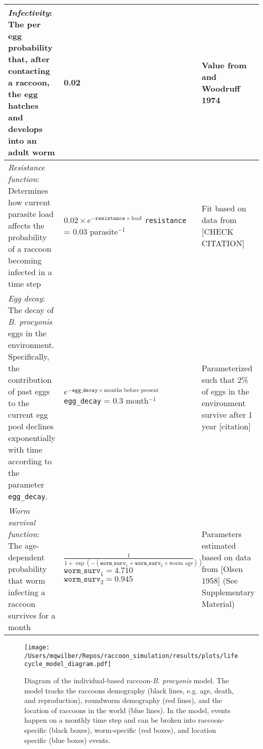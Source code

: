 \documentclass[11pt]{article}
\begin{document}
\begin{longtable}{p{4.5cm} p{4.5cm} p{5cm}}
\hline
\emph{Infectivity}: The per egg probability that, after contacting a raccoon, the egg hatches and develops into an adult worm & 0.02 & Value from \cite{Croll1982} and Woodruff 1974  \\ 
\hline
\emph{Resistance function}: Determines how current parasite load affects the probability of a raccoon becoming infected in a time step &  $0.02 \times e^{-\texttt{resistance} \times \text{load}}$ \newline\newline \texttt{resistance} = 0.03 parasite$^{-1}$ & Fit based on data from \cite{Croll1982} [CHECK CITATION] \\
\hline
\emph{Egg decay}: The decay of \emph{B. procyonis} eggs in the environment. Specifically, the contribution of past eggs to the current egg pool declines exponentially with time according to the parameter \texttt{egg\_decay}. &  $e^{-\texttt{egg\_decay} \times \text{months before present}}$ \newline\newline \texttt{egg\_decay} = 0.3 month$^{-1}$ & Parameterized such that 2\% of eggs in the environment survive after 1 year [citation] \\
\hline
\emph{Worm survival function}: The age-dependent probability that worm infecting a raccoon survives for a month & $\frac{1}{1 + \exp(-(\texttt{worm\_surv}_1 + \texttt{worm\_surv}_2\times \text{worm age}))}$ \newline\newline $\texttt{worm\_surv}_1 = 4.710$ \newline $\texttt{worm\_surv}_2 = 0.945$  & Parameters estimated based on data from [Olsen 1958] (See Supplementary Material)  \\
\bottomrule
\end{longtable}

\clearpage

\begin{figure}
    \texttt{[image: /Users/mqwilber/Repos/raccoon\_simulation/results/plots/lifecycle\_model\_diagram.pdf]}
    \caption{Diagram of the individual-based raccoon-\emph{B. procyonis} model.  The model tracks the raccoons demography (black lines, e.g. age, death, and reproduction), roundworm demography (red lines), and the location of raccoons in the world (blue lines).  In the model, events happen on a monthly time step and can be broken into raccoon-specific (black boxes), worm-specific (red boxes), and location specific (blue boxes) events.}
    \label{fig:mod_diagram}
\end{figure}
\end{document}
